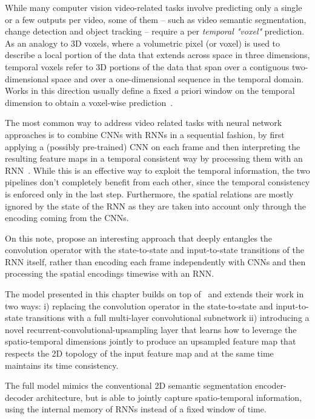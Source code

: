 While many computer vision video-related tasks involve predicting only a single
or a few outputs per video, some of them -- such as video semantic
segmentation, change detection and object tracking -- require a per
\emph{temporal "voxel"} prediction. As an analogy to 3D voxels, where a
volumetric pixel (or voxel) is used to describe a local portion of the data
that extends across space in three dimensions, temporal voxels refer to 3D
portions of the data that span over a contiguous two-dimensional space and over
a one-dimensional sequence in the temporal domain.
Works in this direction usually define a fixed {\emph a priori} window on the
temporal dimension to obtain a voxel-wise prediction~\citep{Tran16v2v}.

The most common way to address video related tasks with neural network
approaches is to combine CNNs with RNNs in a sequential fashion, by first
applying a (possibly pre-trained) CNN on each frame and then interpreting the
resulting feature maps in a temporal consistent way by processing them with an
RNN~\cite{Donahue-et-al-arxiv2014,Vinyals-et-al-CVPR2015,Karpathy+Li-CVPR2015,
Venugopalan_2015_ICCV}. While this is an effective way to exploit the temporal
information, the two pipelines don't completely benefit from each other, since
the temporal consistency is enforced only in the last step. Furthermore, the
spatial relations are mostly ignored by the state of the RNN as they are taken
into account only through the encoding coming from the CNNs.

On this note, \cite{ShiCWYWW15} propose an interesting approach that deeply
entangles the convolution operator with the state-to-state and input-to-state
transitions of the RNN itself, rather than encoding each frame independently
with CNNs and then processing the spatial encodings timewise with an RNN.

The model presented in this chapter builds on top of~\cite{ShiCWYWW15} and
extends their work in two ways: i) replacing the convolution operator in the
state-to-state and input-to-state transitions with a full multi-layer
convolutional subnetwork ii) introducing a novel
recurrent-convolutional-upsampling layer that learns how to leverage the
spatio-temporal dimensions jointly to produce an upsampled feature map that
respects the 2D topology of the input feature map and at the same time
maintains its time consistency.

The full model mimics the conventional 2D semantic segmentation encoder-decoder
architecture, but is able to jointly capture spatio-temporal information, using
the internal memory of RNNs instead of a fixed window of time.

